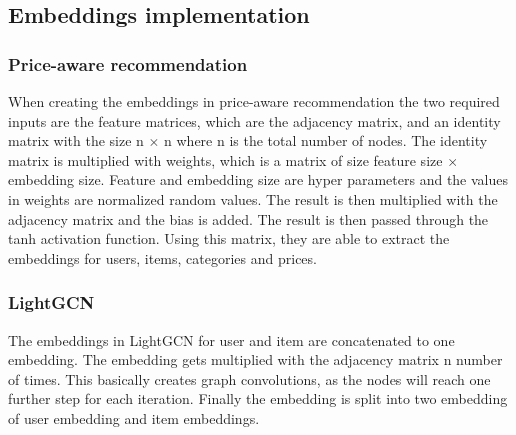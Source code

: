 \subsection{Embeddings implementation}
\subsubsection{Price-aware recommendation}
When creating the embeddings in price-aware recommendation the two required inputs are the feature matrices, which are the adjacency matrix, and an identity matrix with the size n $\times$ n where n is the total number of nodes.
The identity matrix is multiplied with weights, which is a matrix of size feature size $\times$ embedding size.
Feature and embedding size are hyper parameters and the values in weights are normalized random values.
The result is then multiplied with the adjacency matrix and the bias is added.
The result is then passed through the tanh activation function.
Using this matrix, they are able to extract the embeddings for users, items, categories and prices.

\subsubsection{LightGCN}
The embeddings in LightGCN for user and item are concatenated to one embedding.
The embedding gets multiplied with the adjacency matrix n number of times.
This basically creates graph convolutions, as the nodes will reach one further step for each iteration.
Finally the embedding is split into two embedding of user embedding and item embeddings.
